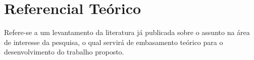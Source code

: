 \chapter[Referencial Teórico]{Referencial Teórico}

Refere-se a um levantamento da literatura já publicada sobre o assunto na área de interesse da pesquisa, o qual servirá de embasamento teórico para o desenvolvimento do trabalho proposto.